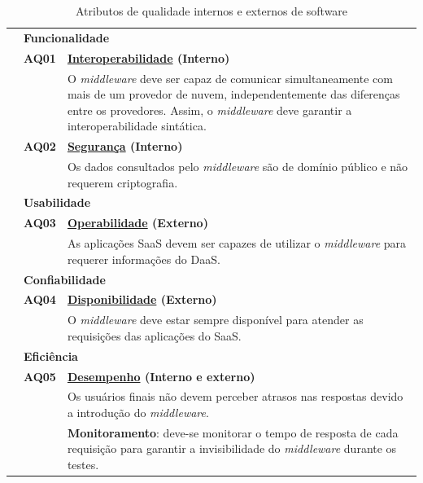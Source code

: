 \documentclass[11pt,a4paper]{article}
\begin{document}
\begin{table}[htb]
\centering
\caption{Atributos de qualidade internos e externos de software} \label{tab:aqs}
\begin{tabular*}{\linewidth}{@{\extracolsep{\fill}}|r r p{12.5cm}|} \hline

& \multicolumn{2}{l|}{\textbf{Funcionalidade}}  \\ \cline{2-3}

&\textbf{AQ01} & \textbf{\underline{Interoperabilidade} (Interno)}\\ 
& & O \textit{middleware} deve ser capaz de comunicar simultaneamente com mais de um provedor de nuvem, independentemente das diferenças entre os provedores. Assim, o \textit{middleware} deve garantir a interoperabilidade sintática.  \\\cline{2-3}

&\textbf{AQ02} & \textbf{\underline{Segurança} (Interno)}\\
& & Os dados consultados pelo \textit{middleware} são de domínio público e não requerem criptografia.  \\ \cline{1-3}


 & \multicolumn{2}{l|}{\textbf{Usabilidade}} \\ \cline{2-3}
 
&\textbf{AQ03} & \textbf{\underline{Operabilidade} (Externo)}\\
& & As aplicações SaaS devem ser capazes de utilizar o \textit{middleware} para requerer informações do DaaS.  \\ \cline{1-3}


 & \multicolumn{2}{l|}{\textbf{Confiabilidade}} \\ \cline{2-3}
 
&\textbf{AQ04} & \textbf{\underline{Disponibilidade} (Externo)}\\ 
& & O \textit{middleware} deve estar sempre disponível para atender as requisições das aplicações do SaaS.  \\ \hline

 

 
& \multicolumn{2}{l|}{\textbf{Eficiência}} \\ \cline{2-3}

&\textbf{AQ05} & \textbf{\underline{Desempenho} (Interno e externo)}\\ 
& & Os usuários finais não devem perceber atrasos nas respostas devido a introdução do \textit{middleware}.\\&
&\textbf{Monitoramento}: deve-se monitorar o tempo de resposta de cada requisição para garantir a invisibilidade do \textit{middleware} durante os testes.   \\ \hline


\end{tabular*}
\end{table}
\end{document}
